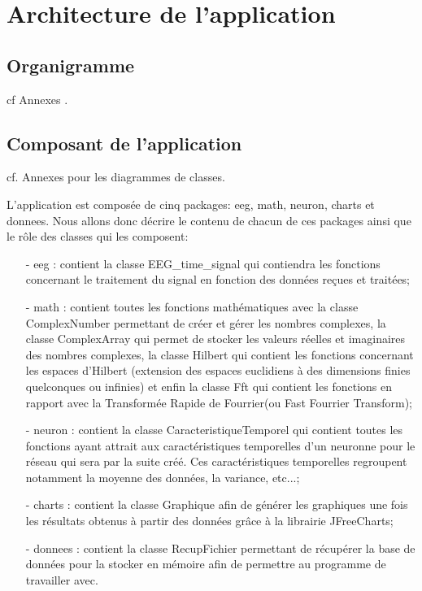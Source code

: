 \part{Architecture de l'application} %
\label{prt:architecture_ _de_ _l_'_application_}
	\chapter{Organigramme} %
	cf Annexes .
		


	\chapter{Composant de l'application} %
	\label{chap:composant_de_l_application}
	 cf. Annexes pour les diagrammes de classes.

	L'application est composée de cinq packages: eeg, math, neuron, charts et donnees. Nous allons donc décrire le contenu de chacun de ces packages ainsi que le rôle des classes qui les composent:
	\begin{itemize}
		
	\item [-] eeg :  contient la classe EEG\_time\_signal qui contiendra les fonctions concernant le traitement du signal en fonction des données reçues et traitées;
	\item [-] math :  contient toutes les fonctions mathématiques avec la classe ComplexNumber permettant de créer et gérer les nombres complexes, la classe ComplexArray qui permet de stocker les valeurs réelles et imaginaires des nombres complexes, la classe Hilbert qui contient les fonctions concernant les espaces d'Hilbert (extension des espaces euclidiens à des dimensions finies quelconques ou infinies) et enfin la classe Fft qui contient les fonctions en rapport avec la Transformée Rapide de Fourrier(ou Fast Fourrier Transform);
	\item [-] neuron : contient la classe CaracteristiqueTemporel qui contient toutes les fonctions ayant attrait aux caractéristiques temporelles d'un neuronne pour le réseau qui sera par la suite créé. Ces caractéristiques temporelles regroupent notamment la moyenne des données, la variance, etc...;
	\item [-] charts : contient la classe Graphique afin de générer les graphiques une fois les résultats obtenus à partir des données grâce à la librairie JFreeCharts;
	\item [-] donnees : contient la classe RecupFichier permettant de récupérer la base de données pour la stocker en mémoire afin de permettre au programme de travailler avec.
	
	\end{itemize}
	
